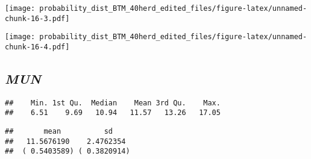\documentclass[]{article}
\newenvironment{Shaded}{\begin{snugshade}}{\end{snugshade}}
\newcommand{\KeywordTok}[1]{\textcolor[rgb]{0.13,0.29,0.53}{\textbf{#1}}}
\newcommand{\StringTok}[1]{\textcolor[rgb]{0.31,0.60,0.02}{#1}}
\newcommand{\CommentTok}[1]{\textcolor[rgb]{0.56,0.35,0.01}{\textit{#1}}}
\newcommand{\OperatorTok}[1]{\textcolor[rgb]{0.81,0.36,0.00}{\textbf{#1}}}
\newcommand{\NormalTok}[1]{#1}
\begin{document}
\texttt{[image: probability\_dist\_BTM\_40herd\_edited\_files/figure-latex/unnamed-chunk-16-3.pdf]}

\begin{Shaded}
\end{Shaded}

\texttt{[image: probability\_dist\_BTM\_40herd\_edited\_files/figure-latex/unnamed-chunk-16-4.pdf]}

\subsection{\texorpdfstring{\textbf{\emph{MUN}}}{MUN}}\label{mun}

\begin{Shaded}
\end{Shaded}

\begin{verbatim}
##    Min. 1st Qu.  Median    Mean 3rd Qu.    Max. 
##    6.51    9.69   10.94   11.57   13.26   17.05
\end{verbatim}

\begin{Shaded}
\end{Shaded}

\begin{verbatim}
##       mean          sd    
##   11.5676190    2.4762354 
##  ( 0.5403589) ( 0.3820914)
\end{verbatim}
\end{document}
